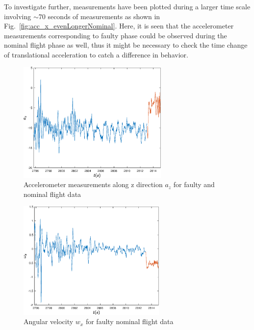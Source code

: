 To investigate further, measurements have been plotted during a larger time scale involving $\sim$70 seconds of measurements as shown in Fig.~\ref{fig:acc_x_evenLongerNominal}. 
Here, it is seen that the accelerometer measurements corresponding to faulty phase could be observed during the nominal flight phase as well, thus it might be necessary to check the time change of translational acceleration to catch a difference in behavior. 

\begin{figure}[!h]
\begin{center}
\includegraphics[width=0.66\textwidth]{figures/acc_z}    %
\caption{Accelerometer measurements along z direction $a_z$ for faulty and nominal flight data} 
\label{fig:acc_z}
\end{center}
\end{figure}

\begin{figure}[h]
\begin{center}
\includegraphics[width=0.65\textwidth]{figures/gyro_x}    %
\caption{Angular velocity $w_x$  for faulty nominal flight data} 
\label{fig:gyro_x}
\end{center}
\end{figure}

